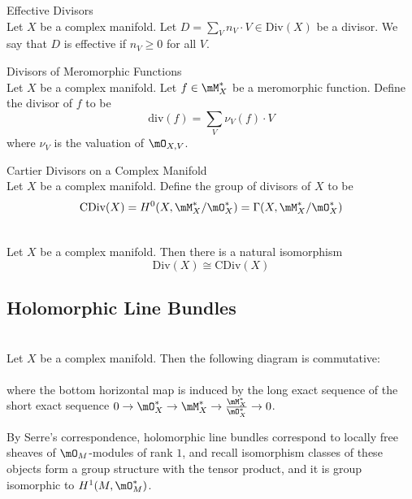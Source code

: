 \documentclass[a4paper]{article}
\begin{document}
\begin{defn}{Effective Divisors}{}\\
Let $X$ be a complex manifold. Let $D=\sum_Vn_V\cdot V\in\text{Div}(X)$ be a divisor. We say that $D$ is effective if $n_V\geq 0$ for all $V$. 
\end{defn}

\begin{defn}{Divisors of Meromorphic Functions}{}\\
Let $X$ be a complex manifold. Let $f\in\mM_X^\ast$ be a meromorphic function. Define the divisor of $f$ to be $$\text{div}(f)=\sum_V\nu_V(f)\cdot V$$ where $\nu_V$ is the valuation of $\mO_{X,V}$. 
\end{defn}

\begin{defn}{Cartier Divisors on a Complex Manifold}{}\\
Let $X$ be a complex manifold. Define the group of divisors of $X$ to be $$\text{CDiv}(X)=H^0(X,\mM_X^\ast/\mO_X^\ast)=\Gamma(X,\mM_X^\ast/\mO_X^\ast)$$
\end{defn}

\begin{prp}{}{}\\
Let $X$ be a complex manifold. Then there is a natural isomorphism $$\text{Div}(X)\cong\text{CDiv}(X)$$
\end{prp}

\subsection{Holomorphic Line Bundles}
\begin{prp}{}{}\\
Let $X$ be a complex manifold. Then the following diagram is commutative: \\
 \\
where the bottom horizontal map is induced by the long exact sequence of the short exact sequence $0\to\mO_X^\ast\to\mM_X^\ast\to\frac{\mM_X^\ast}{\mO_X^\ast}\to 0$. 
\end{prp}

By Serre's correspondence, holomorphic line bundles correspond to locally free sheaves of $\mO_M$-modules of rank $1$, and recall isomorphism classes of these objects form a group structure with the tensor product, and it is group isomorphic to $H^1(M,\mO_M^\ast)$. 
\end{document}
